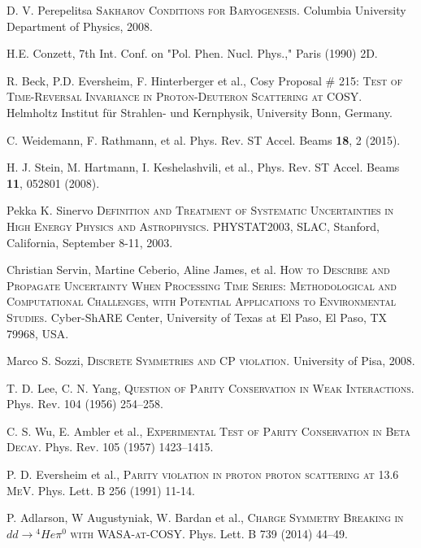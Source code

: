 \documentclass{article}
\begin{document}
	\clearpage
	\begin{thebibliography}{99}
		
		D. V. Perepelitsa
		\textsc{Sakharov Conditions for Baryogenesis}.
		Columbia University Department of Physics,
		2008.
		
		H.E. Conzett,
		7th Int. Conf. on "Pol. Phen. Nucl. Phys.," Paris (1990) 2D.
		
		R. Beck, P.D. Eversheim, F. Hinterberger et al.,
		Cosy Proposal \# 215:
		\textsc{Test of Time-Reversal Invariance in Proton-Deuteron Scattering at 
			COSY}.
		Helmholtz Institut für Strahlen- und Kernphysik, University Bonn, Germany.
		
		C. Weidemann, F. Rathmann, et al. Phys. Rev. ST Accel. Beams \textbf{18}, 2 (2015).
		
		H. J. Stein, M. Hartmann, I. Keshelashvili, et al., Phys. Rev. ST Accel. Beams \textbf{11}, 052801 (2008).
		
		Pekka K. Sinervo
		\textsc{Definition and Treatment of Systematic Uncertainties in High Energy Physics and Astrophysics}.
		PHYSTAT2003, SLAC, Stanford, California, 
		September 8-11, 2003.
		
		Christian Servin, Martine Ceberio, Aline James, et al.
		\textsc{How to Describe and Propagate Uncertainty When Processing Time Series: Methodological and Computational Challenges, with Potential Applications to Environmental Studies}.
		Cyber-ShARE Center, University of Texas at El Paso, El Paso, TX 79968, USA. 
		
		Marco S. Sozzi,
		\textsc{Discrete Symmetries and CP violation}.
		University of Pisa,
		2008.
		
		T. D. Lee, C. N. Yang,
		\textsc{Question of Parity Conservation in Weak Interactions}.
		Phys. Rev. 104 (1956) 254--258.
		
		C. S. Wu, E. Ambler et al.,
		\textsc{Experimental Test of Parity Conservation in Beta Decay}.
		Phys. Rev. 105 (1957) 1423--1415.
		
		P. D. Eversheim et al.,
		\textsc{Parity violation in proton proton scattering at 13.6 MeV}.
		Phys. Lett. B 256 (1991) 11-14.
		
		P. Adlarson, W Augustyniak, W. Bardan et al.,
		\textsc{Charge Symmetry Breaking in $dd \to {}^4He \pi^0$ with WASA-at-COSY}.
		Phys. Lett. B 739 (2014) 44–49.
		

\end{thebibliography}
\end{document}
